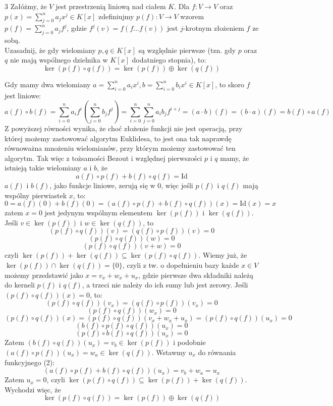 \documentclass{../note}
\begin{document}
\begin{zadanie}{3}
Załóżmy, że $V$ jest przestrzenią liniową nad ciałem $K$. Dla $f:V\rightarrow V$ oraz $p(x)=\sum_{j=0}^{n}a_{j}x^{j}\in K[x]$ zdefiniujmy $p(f):V\rightarrow V$ wzorem $p(f)=\sum_{j=0}^{n}a_{j}f^{j}$, gdzie $f^{j}(v)=f(f\dots f(v))$ jest $j$-krotnym złożeniem $f$ ze sobą. \\
Uzasadnij, że gdy wielomiany $p, q\in K[x]$ są względnie pierwsze (tzn. gdy $p$ oraz $q$ nie mają wspólnego dzielnika w $K[x]$ dodatniego stopnia), to:
$$ \ker(p(f)\circ q(f))=\ker(p(f))\oplus \ker(q(f)) $$
\end{zadanie}
\begin{rozwiazanie}
Gdy mamy dwa wielomiany $a = \sum_{i=0}^{n}a_{i}x^{i}, b = \sum_{i=0}^{n}b_{i}x^{i} \in K[x]$, to skoro $f$ jest liniowe:
\begin{equation}
a(f) \circ b(f) = \sum_{i=0}^{n}a_{i}f^{i}\left(\sum_{j=0}^{n}b_{j}f^j\right) = \sum_{i=0}^{n}\sum_{j=0}^{n}a_{i}b_{j}f^{i+j} = (a \cdot b)(f) = (b \cdot a)(f) = b(f) \circ a(f)
\end{equation}
Z powyższej równości wynika, że choć złożenie funkcji nie jest operacją, przy której możemy zastowować algorytm Euklidesa, to jest ona tak naprawdę równoważna mnożeniu wielomianów, przy którym możemy zastowować ten algorytm. Tak więc z tożsamości Bezout i względnej pierwszości $p$ i $q$ mamy, że istnieją takie wielomiany $a$ i $b$, że
\begin{equation}
a(f) \circ p(f) + b(f) \circ q(f) = \text{Id}
\end{equation}
$a(f)$ i $b(f)$, jako funkcje liniowe, zerują się w 0, więc jeśli $p(f)$ i $q(f)$ mają wspólny pierwiastek $x$, to:
\[0 = a(f)(0) + b(f)(0) = (a(f) \circ p(f) + b(f) \circ q(f))(x) = \text{Id}(x) = x\]
zatem $x = 0$ jest jedynym wspólnym elementem $\ker(p(f))$ i $\ker(q(f))$. Jeśli $v \in \ker(p(f))$ i $w \in \ker(q(f))$, to 
\[(p(f) \circ q(f))(v) = (q(f) \circ p(f))(v) = 0\]
\[(p(f) \circ q(f))(w) = 0\]
\[(p(f) \circ q(f))(v + w) = 0\] czyli $\ker(p(f)) + \ker(q(f)) \subseteq \ker(p(f) \circ q(f))$. Wiemy już, że $\ker(p(f)) \cap \ker(q(f)) = \{0\}$, czyli z tw. o dopełnieniu bazy każde $x \in V$ możemy przedstawić jako $x = v_x + w_x + u_x$, gdzie pierwsze dwa składniki należą do kerneli $p(f)$ i $q(f)$, a trzeci nie należy do ich sumy lub jest zerowy. Jeśli $(p(f) \circ q(f))(x) = 0$, to:
\[(p(f) \circ q(f))(v_x) = (q(f) \circ p(f))(v_x) = 0\]
\[(p(f) \circ q(f))(w_x) = 0\]
\[(p(f) \circ q(f))(x) = (p(f) \circ q(f))(v_x + w_x + u_x) = (p(f) \circ q(f))(u_x) = 0\]
\[(b(f) \circ p(f) \circ q(f))(u_x) = 0\]
\[(p(f) \circ b(f) \circ q(f))(u_x) = 0\]
Zatem $(b(f) \circ q(f))(u_x) = v_b \in \ker(p(f))$ i podobnie $(a(f) \circ p(f))(u_x) = w_a \in \ker(q(f))$.
Wstawmy $u_x$ do równania funkcyjnego (2):
\[(a(f) \circ p(f) + b(f) \circ q(f))(u_x) = v_b + w_a = u_x\]
Zatem $u_x = 0$, czyli $\ker(p(f) \circ q(f)) \subseteq \ker(p(f)) + \ker(q(f))$. Wychodzi więc, że \[\ker(p(f) \circ q(f)) = \ker(p(f)) \oplus \ker(q(f))\]
\end{rozwiazanie}
\end{document}
